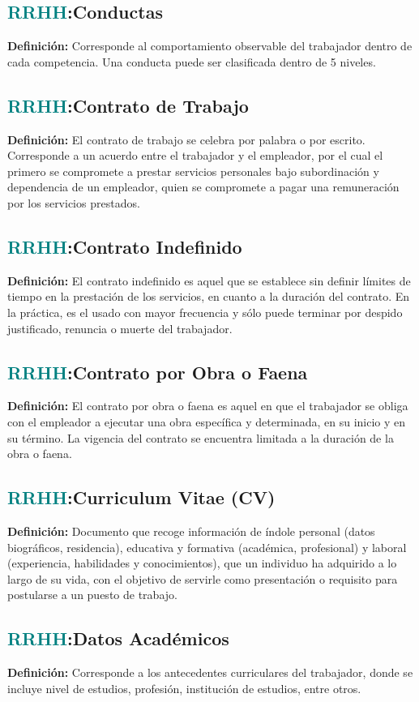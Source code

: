 \documentclass[12pt]{article}
\begin{document}
\subsection{\textcolor{teal}{RRHH}:{Conductas}}
\textbf{Definición:} Corresponde al comportamiento observable del trabajador dentro de cada competencia. Una conducta puede ser clasificada dentro de 5 niveles.
\subsection{\textcolor{teal}{RRHH}:{Contrato de Trabajo}}
\textbf{Definición:} El contrato de trabajo se celebra por palabra o por escrito. Corresponde a un acuerdo entre el trabajador y el empleador, por el cual el primero se compromete a prestar servicios personales bajo subordinación y dependencia de un empleador, quien se compromete a pagar una remuneración por los servicios prestados.
\subsection{\textcolor{teal}{RRHH}:{Contrato Indefinido}}
\textbf{Definición:} El contrato indefinido es aquel que se establece sin definir límites de tiempo en la prestación de los servicios, en cuanto a la duración del contrato. En la práctica, es el usado con mayor frecuencia y sólo puede terminar por despido justificado, renuncia o muerte del trabajador.
\subsection{\textcolor{teal}{RRHH}:{Contrato por Obra o Faena}}
\textbf{Definición:} El contrato por obra o faena es aquel en que el trabajador se obliga con el empleador a ejecutar una obra específica y determinada, en su inicio y en su término. La vigencia del contrato se encuentra limitada a la duración de la obra o faena.
\subsection{\textcolor{teal}{RRHH}:{Curriculum Vitae (CV)}}
\textbf{Definición:} Documento que recoge información de índole personal (datos biográficos, residencia), educativa y formativa (académica, profesional) y laboral (experiencia, habilidades y conocimientos), que un individuo ha adquirido a lo largo de su vida, con el objetivo de servirle como presentación o requisito para postularse a un puesto de trabajo.
\subsection{\textcolor{teal}{RRHH}:{Datos Académicos}}
\textbf{Definición:} Corresponde a los antecedentes curriculares del trabajador, donde se incluye nivel de estudios, profesión, institución de estudios, entre otros.
\end{document}
